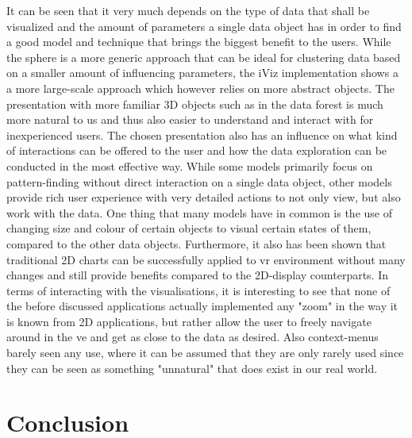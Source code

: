 It can be seen that it very much depends on the type of data that shall be visualized and the amount of parameters a single data object has in order to find a good model and technique that brings the biggest benefit to the users. While the sphere is a more generic approach that can be ideal for clustering data based on a smaller amount of influencing parameters, the iViz implementation shows a a more large-scale approach which however relies on more abstract objects. The presentation with more familiar 3D objects such as in the data forest is much more natural to us and thus also easier to understand and interact with for inexperienced users. \newline
The chosen presentation also has an influence on what kind of interactions can be offered to the user and how the data exploration can be conducted in the most effective way. While some models primarily focus on pattern-finding without direct interaction on a single data object, other models provide rich user experience with very detailed actions to not only view, but also work with the data. One thing that many models have in common is the use of changing size and colour of certain objects to visual certain states of them, compared to the other data objects. Furthermore, it also has been shown that traditional 2D charts can be successfully applied to \gls{vr} environment without many changes and still provide benefits compared to the 2D-display counterparts. \newline
In terms of interacting with the visualisations, it is interesting to see that none of the before discussed applications actually implemented any "zoom" in the way it is known from 2D applications, but rather allow the user to freely navigate around in the \gls{ve} and get as close to the data as desired. Also context-menus barely seen any use, where it can be assumed that they are only rarely used since they can be seen as something "unnatural" that does exist in our real world.



\section{Conclusion}

\label{SectionLiteratureReviewConclusion}

